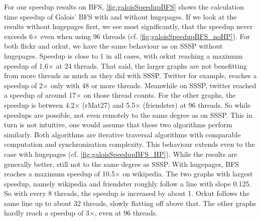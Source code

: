 For our speedup results on BFS, \autoref{fig:galoisSpeedupBFS} shows the calculation time speedup of Galois' BFS with and without hugepages.
If we look at the results without hugepages first, we see most significantly, that the speedup never exceeds 6$\times$ even when using 96 threads (cf. \autoref{fig:galoisSpeedupBFS_noHP}).
For both flickr and orkut, we have the same behaviour as on SSSP without hugepages. Speedup is close to 1 in all cases, with orkut reaching a maximum speedup of 1.6$\times$ at 24 threads.
That said, the larger graphs are not benefitting from more threads as much as they did with SSSP. Twitter for example, reaches a speedup of 2$\times$ only with 48 or more threads. Meanwhile on SSSP, twitter reached a speedup of around 17$\times$ on those thread counts.
For the other graphs, the speedup is between 4.2$\times$ (rMat27) and 5.5$\times$ (friendster) at 96 threads. So while speedups are possible, not even remotely to the same degree as on SSSP. This in turn is not intuitive, one would assume that these two algorithms perform similarly. Both algorithms are iterative traversal algorithms with comparable computation and synchronization complexity.
This behaviour extends even to the case with hugepages (cf. \autoref{fig:galoisSpeedupBFS_HP}). While the results are generally better, still not to the same degree as SSSP. With hugepages, BFS reaches a maximum speedup of 10.5$\times$ on wikipedia. The two graphs with largest speedup, namely wikipedia and friendster roughly follow a line with slope 0.125. So with every 8 threads, the speedup is increased by about 1. Orkut follows the same line up to about 32 threads, slowly flatting off above that.
The other graphs hardly reach a speedup of 3$\times$, even at 96 threads.

